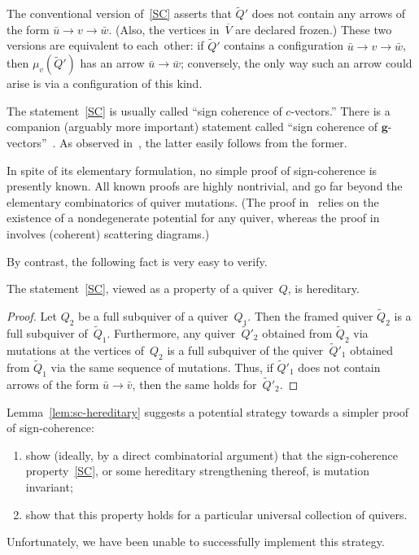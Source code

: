 \documentclass[ALCO,ThmDefs,Unicode,epreuves,published]{cedram}
\begin{document}

\begin{remark}
The conventional version of~\ref{SC} asserts that $\widetilde Q'$ does not contain any 
arrows of the form $\bar u\to v\to \bar w$. 
(Also, the vertices in~$\overline V$ are declared frozen.) 
These two versions are equivalent to each~other: 
if $\widetilde Q'$ contains a configuration $\bar u\to v\to \bar w$,
then $\mu_v(\widetilde Q')$ has an arrow $\bar u\to \bar w$; conversely, 
the only way such an arrow could arise is via a configuration of this kind. 
\end{remark}

\begin{remark}
The statement~\ref{SC} is usually called ``sign coherence of $c$-vectors.''
There is a companion (arguably more important) statement called
``sign coherence of $\mathbf{g}$-vectors''~\cite{ca4}. 
As observed in~\cite{nakanishi-zelevinsky}, the latter easily follows from the former. 
\end{remark}

In spite of its elementary formulation, no simple proof of sign-coherence is presently known. 
All known proofs are highly nontrivial, 
and go far beyond the elementary combinatorics of quiver mutations. 
(The proof in~\cite{DWZ2} relies on the existence of a nondegenerate potential for any quiver,
whereas the proof in~\cite{GHKK} involves (coherent) scattering diagrams.) 

By contrast, the following fact is very easy to verify. 

\begin{lemma}
\label{lem:sc-hereditary}
The statement~\ref{SC}, viewed as a property of a quiver~$Q$, is hereditary. 
\end{lemma}

\begin{proof}
Let $Q_2$ be a full subquiver of a quiver~$Q_1$.
Then the framed quiver $\widetilde Q_2$ is a full subquiver of~$\widetilde Q_1$.
Furthermore, any quiver~$\widetilde Q'_2$ obtained from $\widetilde Q_2$ 
via mutations at the vertices of~$Q_2$
is a full subquiver of the quiver~$\widetilde Q'_1$ obtained from $\widetilde Q_1$ via the same sequence of mutations.
Thus, if $\widetilde Q'_1$ does not contain arrows of the form $\bar u\to \bar v$,
then the same holds for~$\widetilde Q'_2$. 
\end{proof}

$\!$Lemma~\ref{lem:sc-hereditary} suggests a potential strategy 
towards a simpler proof of sign-coherence:
\begin{enumerate}[label=(\alph*)]
\item\label{sect5_i} %
show (ideally, by a direct combinatorial argument) that the sign-coherence property~\ref{SC}, 
or some hereditary %
strengthening thereof, is mutation inva\-riant; 
\item\label{sect5_ii} %
show that this property holds for a particular universal collection of quivers. 
\end{enumerate}
Unfortunately, we have been unable to successfully implement this strategy. 
\end{document}
